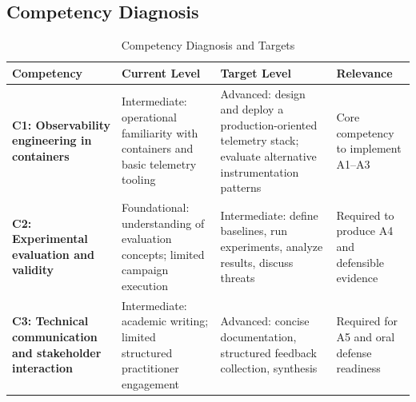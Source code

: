 \subsection{Competency Diagnosis}

\begin{table}[htbp]
\centering
\caption{Competency Diagnosis and Targets}
\label{tab:competencies}
\footnotesize
\begin{tabular}{@{}p{}p{}p{}p{}@{}}
		\textbf{Competency} & \textbf{Current Level} & \textbf{Target Level} & \textbf{Relevance} \\
\midrule
		\textbf{C1: Observability engineering in containers} &
Intermediate: operational familiarity with containers and basic telemetry tooling &
Advanced: design and deploy a production-oriented telemetry stack; evaluate alternative instrumentation patterns &
Core competency to implement A1--A3 \\
\addlinespace
		\textbf{C2: Experimental evaluation and validity} &
Foundational: understanding of evaluation concepts; limited campaign execution &
Intermediate: define baselines, run experiments, analyze results, discuss threats &
Required to produce A4 and defensible evidence \\
\addlinespace
		\textbf{C3: Technical communication and stakeholder interaction} &
Intermediate: academic writing; limited structured practitioner engagement &
Advanced: concise documentation, structured feedback collection, synthesis &
Required for A5 and oral defense readiness \\
\bottomrule
\end{tabular}
\end{table}


